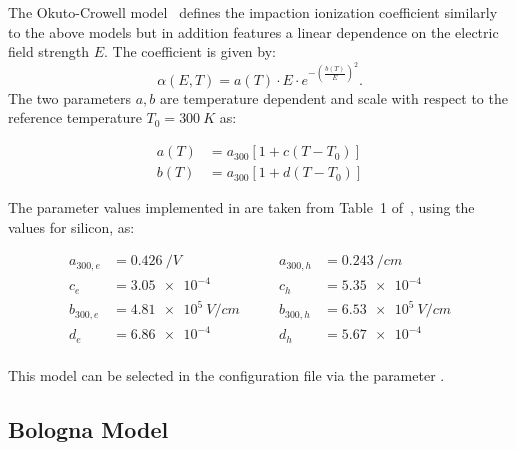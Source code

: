 The Okuto-Crowell model~\cite{okuto} defines the impaction ionization coefficient similarly to the above models but in addition features a linear dependence on the electric field strength $E$.
The coefficient is given by:
\begin{equation}
    \label{eq:multi:oku}
    \alpha (E, T) = a(T) \cdot E \cdot e^{-\left(\frac{b(T)}{E}\right)^2}.
\end{equation}
The two parameters $a, b$ are temperature dependent and scale with respect to the reference temperature $T_0 = \SI{300}{K}$ as:

\begin{equation}
    \begin{split}
        a(T) &= a_{300} \left[ 1 + c\left(T - T_0\right) \right]\\
        b(T) &= a_{300} \left[ 1 + d\left(T - T_0\right) \right]
    \end{split}
\end{equation}

The parameter values implemented in \apsq are taken from Table~1 of~\cite{overstraeten}, using the values for silicon, as:

\begin{equation*}
    \begin{split}
        a_{300, e} &= \SI{0.426}{/V}\\
        c_{e} &= \num{3.05e-4}\\
        b_{300, e} &= \SI{4.81e5}{V/cm}\\
        d_{e} &= \num{6.86e-4}\\
    \end{split}
    \qquad
    \begin{split}
        a_{300, h} &= \SI{0.243}{/cm}\\
        c_{h} &= \num{5.35e-4}\\
        b_{300, h} &= \SI{6.53e5}{V/cm}\\
        d_{h} &= \num{5.67e-4}\\
    \end{split}
\end{equation*}

This model can be selected in the configuration file via the parameter .

\subsection{Bologna Model}
\label{sec:multi:bologna}

